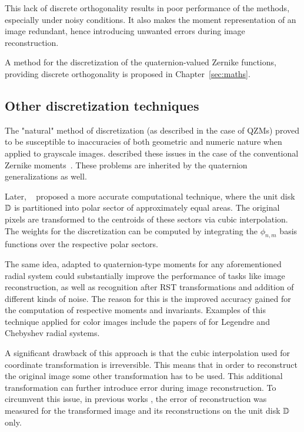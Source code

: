 This lack of discrete orthogonality results in poor performance of the methods, especially under noisy conditions. It also makes the moment representation of an image redundant, hence introducing unwanted errors during image reconstruction.


A method for the discretization of the quaternion-valued Zernike functions, providing discrete orthogonality is proposed in Chapter~\ref{sec:maths}.


\subsection{Other discretization techniques}
The "natural" method of discretization (as described in the case of QZMs) proved to be susceptible to inaccuracies of both geometric and numeric nature when applied to grayscale images. \citeauthor{LiaoPawlak} described these issues in the case of the conventional Zernike moments~\cite{LiaoPawlak,PawlakLiao}. These problems are inherited by the quaternion generalizations as well. 


Later, \citeauthor{Xin}~\cite{Xin} proposed a more accurate computational technique, where the unit disk $\mathbb{D}$ is partitioned into polar sector of approximately equal areas. The original pixels are transformed to the centroids of these sectors via cubic interpolation. The weights for the discretization can be computed by integrating the $\phi_{n,m}$ basis functions over the respective polar sectors.


The same idea, adapted to quaternion-type moments for any aforementioned radial system could substantially improve the performance of tasks like image reconstruction, as well as recognition after RST transformations and addition of different kinds of noise. The reason for this is the improved accuracy gained for the computation of respective moments and invariants. Examples of this technique applied for color images include the papers of \citeauthor{HosnyLegendre} for Legendre \cite{HosnyLegendre} and Chebyshev \cite{HosnyChebyshev} radial systems.


A significant drawback of this approach is that the cubic interpolation used for coordinate transformation is irreversible. This means that in order to reconstruct the original image some other transformation has to be used. This additional transformation can further introduce error during image reconstruction. 
To circumvent this issue, in previous works \cite{LiaoPawlak,PawlakLiao,Xin,HosnyLegendre,HosnyChebyshev}, the error of reconstruction was measured for the transformed image and its reconstructions on the unit disk $\mathbb{D}$ only. 


